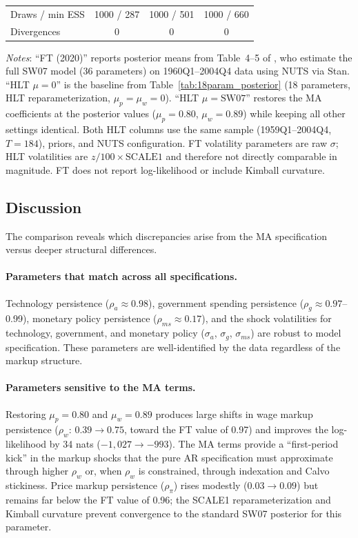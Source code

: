 \documentclass[12pt]{article}
\theoremstyle{plain}
\theoremstyle{definition}
\theoremstyle{remark}
\begin{document}
\begin{table}[htbp]
\begin{tabular}{llccc}
\multicolumn{2}{l}{Draws / min ESS} & 1000 / 287 & 1000 / 501 & 1000 / 660 \\
\multicolumn{2}{l}{Divergences} & 0 & 0 & 0 \\
\bottomrule
\end{tabular}
\smallskip
{\footnotesize \textit{Notes}: ``FT (2020)'' reports posterior means from Table~4--5 of \citet{farkas2020bayesian}, who estimate the full SW07 model (36 parameters) on 1960Q1--2004Q4 data using NUTS via Stan. ``HLT $\mu=0$'' is the baseline from Table~\ref{tab:18param_posterior} (18 parameters, HLT reparameterization, $\mu_p = \mu_w = 0$). ``HLT $\mu=\text{SW07}$'' restores the MA coefficients at the \citet{farkas2020bayesian} posterior values ($\mu_p = 0.80$, $\mu_w = 0.89$) while keeping all other settings identical. Both HLT columns use the same sample (1959Q1--2004Q4, $T=184$), priors, and NUTS configuration. FT volatility parameters are raw $\sigma$; HLT volatilities are $z/100 \times \text{SCALE1}$ and therefore not directly comparable in magnitude. FT does not report log-likelihood or include Kimball curvature.}
\end{table}

\subsection{Discussion}

The comparison reveals which discrepancies arise from the MA specification versus deeper structural differences.

\paragraph{Parameters that match across all specifications.} Technology persistence ($\rho_a \approx 0.98$), government spending persistence ($\rho_g \approx 0.97$--0.99), monetary policy persistence ($\rho_{ms} \approx 0.17$), and the shock volatilities for technology, government, and monetary policy ($\sigma_a$, $\sigma_g$, $\sigma_{ms}$) are robust to model specification. These parameters are well-identified by the data regardless of the markup structure.

\paragraph{Parameters sensitive to the MA terms.} Restoring $\mu_p = 0.80$ and $\mu_w = 0.89$ produces large shifts in wage markup persistence ($\rho_w$: $0.39 \to 0.75$, toward the FT value of 0.97) and improves the log-likelihood by 34 nats ($-1{,}027 \to -993$). The MA terms provide a ``first-period kick'' in the markup shocks that the pure AR specification must approximate through higher $\rho_w$ or, when $\rho_w$ is constrained, through indexation and Calvo stickiness. Price markup persistence ($\rho_\pi$) rises modestly ($0.03 \to 0.09$) but remains far below the FT value of 0.96; the SCALE1 reparameterization and Kimball curvature prevent convergence to the standard SW07 posterior for this parameter.
\end{document}
